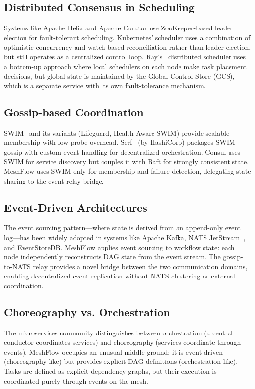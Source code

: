 \documentclass[sigconf]{acmart}
\begin{document}
\subsection{Distributed Consensus in Scheduling}

Systems like Apache Helix and Apache Curator use ZooKeeper-based leader election for fault-tolerant scheduling. Kubernetes' scheduler uses a combination of optimistic concurrency and watch-based reconciliation rather than leader election, but still operates as a centralized control loop. Ray's~\cite{ray} distributed scheduler uses a bottom-up approach where local schedulers on each node make task placement decisions, but global state is maintained by the Global Control Store (GCS), which is a separate service with its own fault-tolerance mechanism.

\subsection{Gossip-based Coordination}

SWIM~\cite{swim} and its variants (Lifeguard, Health-Aware SWIM) provide scalable membership with low probe overhead. Serf~\cite{serf} (by HashiCorp) packages SWIM gossip with custom event handling for decentralized orchestration. Consul uses SWIM for service discovery but couples it with Raft for strongly consistent state. MeshFlow uses SWIM only for membership and failure detection, delegating state sharing to the event relay bridge.

\subsection{Event-Driven Architectures}

The event sourcing pattern---where state is derived from an append-only event log---has been widely adopted in systems like Apache Kafka, NATS JetStream~\cite{nats}, and EventStoreDB. MeshFlow applies event sourcing to workflow state: each node independently reconstructs DAG state from the event stream. The gossip-to-NATS relay provides a novel bridge between the two communication domains, enabling decentralized event replication without NATS clustering or external coordination.

\subsection{Choreography vs. Orchestration}

The microservices community distinguishes between orchestration (a central conductor coordinates services) and choreography (services coordinate through events). MeshFlow occupies an unusual middle ground: it is event-driven (choreography-like) but provides explicit DAG definitions (orchestration-like). Tasks are defined as explicit dependency graphs, but their execution is coordinated purely through events on the mesh.
\end{document}
